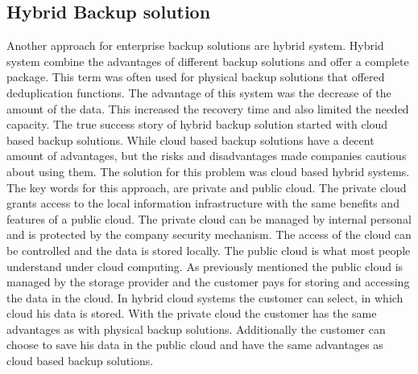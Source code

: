 \documentclass[12pt]{article}
\begin{document}
\subsection{Hybrid Backup solution}
Another approach for enterprise backup solutions are hybrid system. Hybrid system combine the advantages of different backup solutions and offer a complete package. This term was often used for physical backup solutions that offered deduplication functions. The advantage of this system was the decrease of the amount of the data. This increased the recovery time and also limited the needed capacity.
\newline
\newline
The true success story of hybrid backup solution started with cloud based backup solutions. While cloud based backup solutions have a decent amount of advantages, but the risks and disadvantages made companies cautious about using them.  The solution for this problem was cloud based hybrid systems. The key words for this approach, are private and public cloud.
\newline
\newline
The private cloud  grants access to the local information infrastructure with the same benefits and features of a public cloud.  The private cloud can be managed by internal personal and is protected by the company security mechanism.  The access of the cloud can be controlled and the data is stored locally.
\newline
\newline
The public cloud is what most people understand under cloud computing. As previously mentioned the public cloud is managed by the storage provider and the customer pays for storing and accessing the data in the cloud.
\newline
\newline
In hybrid cloud systems the customer can select, in which cloud his data is stored. With the private cloud the customer has the same advantages as with physical backup solutions. Additionally the customer can choose to save his data in the public cloud and have the same advantages as cloud based backup solutions.
\end{document}
